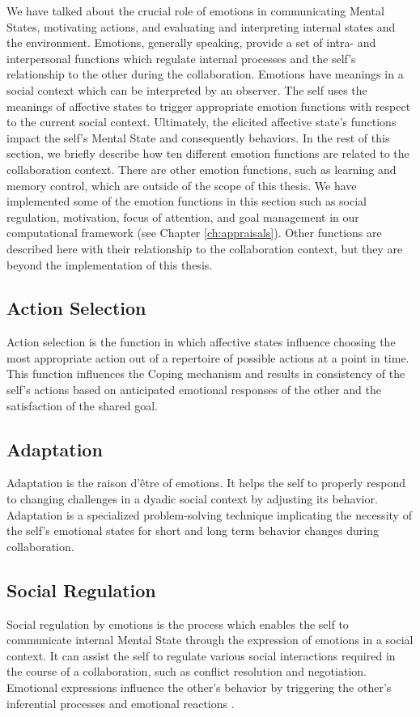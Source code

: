 \documentclass[12pt]{report}
\begin{document}
We have talked about the crucial role of emotions in communicating Mental
States, motivating actions, and evaluating and interpreting internal states and
the environment. Emotions, generally speaking, provide a set of intra- and
interpersonal functions which regulate internal processes and the self's
relationship to the other during the collaboration. Emotions have meanings in a
social context which can be interpreted by an observer. The self uses the
meanings of affective states to trigger appropriate emotion functions with
respect to the current social context. Ultimately, the elicited affective state's
functions impact the self's Mental State and consequently behaviors. In the rest
of this section, we briefly describe how ten different emotion functions are
related to the collaboration context. There are other emotion functions, such as
learning and memory control, which are outside of the scope of this thesis. We
have implemented some of the emotion functions in this section such as social
regulation, motivation, focus of attention, and goal management in our
computational framework (see Chapter \ref{ch:appraisals}). Other functions are
described here with their relationship to the collaboration context, but they
are beyond the implementation of this thesis.

\subsection{Action Selection} Action selection is the function in which
affective states influence choosing the most appropriate action out of a
repertoire of possible actions at a point in time. This function influences the
Coping mechanism and results in consistency of the self's actions based on
anticipated emotional responses of the other and the satisfaction of the shared
goal.

\subsection{Adaptation} Adaptation is the raison d'\^{e}tre of emotions. It
helps the self to properly respond to changing challenges in a dyadic social
context by adjusting its behavior. Adaptation is a specialized problem-solving
technique implicating the necessity of the self's emotional states for short and
long term behavior changes during collaboration.

\subsection{Social Regulation} Social regulation by emotions is the process
which enables the self to communicate internal Mental State through the
expression of emotions in a social context. It can assist the self to regulate
various social interactions required in the course of a collaboration, such as
conflict resolution and negotiation. Emotional expressions influence the other's
behavior by triggering the other's inferential processes and emotional reactions
\cite{kleef:emotion-regulate-social}.
\end{document}
